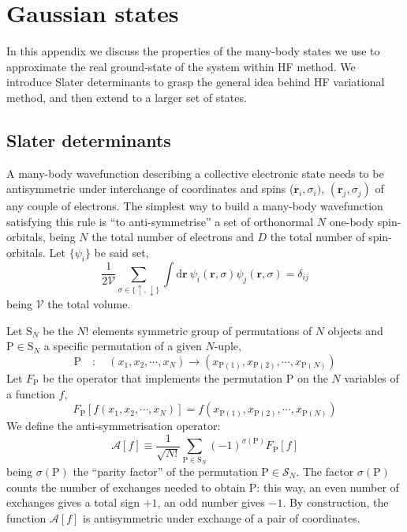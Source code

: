 \chapter{Gaussian states}\label{app:slater-gaussian}

In this appendix we discuss the properties of the many-body states we use to approximate the real ground-state of the system within HF method. We introduce Slater determinants to grasp the general idea behind HF variational method, and then extend to a larger set of states.

\section{Slater determinants}

A many-body wavefunction describing a collective electronic state needs to be antisymmetric under interchange of coordinates and spins ($\mathbf{r}_i,\sigma_i)$, $(\mathbf{r}_j,\sigma_j)$ of any couple of electrons. The simplest way to build a many-body wavefunction satisfying this rule is ``to anti-symmetrise'' a set of orthonormal $N$ one-body spin-orbitals, being $N$ the total number of electrons and $D$ the total number of spin-orbitals. Let $\lbrace \psi_i \rbrace$ be said set,
\[
	\frac{1}{2\mathcal{V}} \sum_{\sigma \in \lbrace \uparrow,\downarrow \rbrace} \int \mathrm{d}\mathbf{r}\ \psi_i(\mathbf{r},\sigma) \psi_j(\mathbf{r},\sigma) = \delta_{ij}
\]
being $\mathcal{V}$ the total volume. 

Let $\mathrm{S}_N$ be the $N!$ elements symmetric group of permutations of $N$ objects and $\mathrm{P} \in \mathrm{S}_N$ a specific permutation of a given $N$-uple,
\[
	\mathrm{P}
	\quad\colon\quad
	(x_1, x_2, \cdots, x_N)
	\to
	\left(x_{\mathrm{P}(1)},x_{\mathrm{P}(2)},\cdots,x_{\mathrm{P}(N)}\right)
\]
Let $F_\mathrm{P}$ be the operator that implements the permutation $\mathrm{P}$ on the $N$ variables of a function $f$,
\[
	F_\mathrm{P} \left[ f (x_1, x_2, \cdots, x_N) \right] = f \left(x_{\mathrm{P}(1)},x_{\mathrm{P}(2)},\cdots,x_{\mathrm{P}(N)}\right)
\]
We define the anti-symmetrisation operator:
\[
	\mathcal{A}[f] \equiv \frac{1}{\sqrt{N!}} \sum_{\mathrm{P}\in \mathrm{S}_N} (-1)^{\sigma(\mathrm{P})} F_\mathrm{P}[f]
\]
being $\sigma(\mathrm{P})$ the ``parity factor'' of the permutation $\mathrm{P} \in \mathcal{S}_N$. The factor $\sigma(\mathrm{P})$ counts the number of exchanges needed to obtain $\mathrm{P}$: this way, an even number of exchanges gives a total sign $+1$, an odd number gives $-1$. By construction, the function $\mathcal{A}[f]$ is antisymmetric under exchange of a pair of coordinates.

